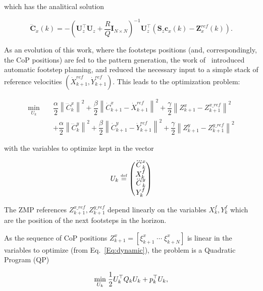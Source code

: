 which has the analitical solution

\begin{equation}
\dddot{\mathbf{C}}_x(k) = -(\mathbf{U}_z^{\top} \mathbf{U}_z + \dfrac{R}{Q} \mathbf{I}_{N \times N})^{-1} \mathbf{U}_z^{\top}(\mathbf{S}_z \mathbf{c}_x(k) - \mathbf{Z}_x^{ref}(k)).
\end{equation}

As an evolution of this work, where the footsteps positions (and, correspondingly, the CoP positions) are fed to the pattern generation, the work of~\cite{HerdtAR2010} introduced automatic footstep planning, and reduced the necessary input to a simple stack of reference velocities $(\dot{X}_{k+1}^{ref},\dot{Y}_{k+1}^{ref})$. This leads to the optimization problem:

\begin{eqnarray}
\nonumber
 \underset{U_{k}}{\min} \; && \dfrac{\alpha}{2} \left\| \dddot{C}_k^{x} \right\|^2 + \dfrac{\beta}{2} \left\| \dot{C}_{k+1}^{x} - \dot{X}_{k+1}^{ref} \right\|^2
 + \dfrac{\gamma}{2} \left\| Z_{k+1}^x - Z_{k+1}^{x\_{ref}} \right\|^2 \\
 && + \dfrac{\alpha}{2} \left\| \dddot{C}_k^{y} \right\|^2 + \dfrac{\beta}{2} \left\| \dot{C}_{k+1}^{y} - \dot{Y}_{k+1}^{ref} \right\|^2
 + \dfrac{\gamma}{2} \left\| Z_{k+1}^y - Z_{k+1}^{y\_{ref}} \right\|^2
\label{Eq:MinJerk}
\end{eqnarray}

with the variables to optimize kept in the vector 

$$
U_{k} \stackrel{\mbox{\tiny def}}{=} 
\left(
\begin{matrix}
\dddot{C}_k^{x} \\
X_{k}^{f} \\
\dddot{C}_k^{y} \\
Y_{k}^{f}
\end{matrix}
\right)
$$

The ZMP references $Z_{k+1}^{x\_{ref}},Z_{k+1}^{y\_{ref}}$ depend linearly on the variables $X_{k}^{f},Y_{k}^{f}$ which are the position of the next footsteps in the horizon.

As the sequence of CoP positions $Z_{k+1}^x = [ {\xi}^x_{k+1} \; \cdots \; {\xi}^x_{k+N}]$ is linear in the variables to optimize (from Eq.~\ref{Eq:dynamic}), the problem is a Quadratic Program (QP) 

\begin{equation}
 \underset{U_k}{\min} \; \dfrac{1}{2} U_k^{\top} Q_k U_k + p_k^{\top} U_k,
\label{Eq:QP}
\end{equation}

